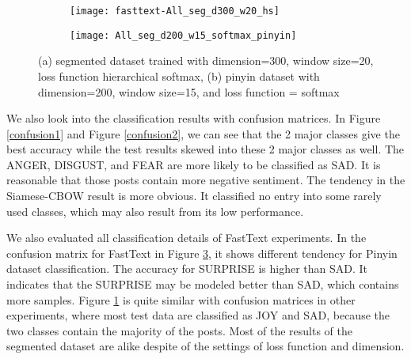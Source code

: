 \begin{figure}
\centering
\begin{subfigure}[b]{1\textwidth}
   \texttt{[image: fasttext-All\_seg\_d300\_w20\_hs]}
   \caption{}
   \label{confusion3} 
\end{subfigure}

\begin{subfigure}[b]{1\textwidth}
   \texttt{[image: All\_seg\_d200\_w15\_softmax\_pinyin]}
   \caption{}
   \label{confusion4}
\end{subfigure}
\caption[Confusion matrix of FastText]{(a) segmented dataset trained with dimension=300, window size=20, loss function hierarchical softmax,
(b) pinyin dataset with dimension=200, window size=15, and loss function = softmax
}
\end{figure}

We also look into the classification results with confusion matrices. 
In Figure \ref{confusion1} and Figure \ref{confusion2}, we can see that the 2 major classes give the best accuracy while the test results skewed into these 2 major classes as well.  
The ANGER, DISGUST, and FEAR are more likely to be classified as SAD. It is reasonable that those posts contain more negative sentiment.
The tendency in the Siamese-CBOW result is more obvious. It classified no entry into some rarely used classes, which may also result from its low performance.

We also evaluated all classification details of FastText experiments.
In the confusion matrix for FastText in Figure \ref{confusion4}, it shows different tendency for Pinyin dataset classification. 
The accuracy for SURPRISE is higher than SAD. It indicates that the SURPRISE may be modeled better than SAD, which contains more samples.
Figure \ref{confusion3} is quite similar with confusion matrices in other experiments, where most test data are classified as JOY and SAD, because the two classes contain the majority of the posts.
Most of the results of the segmented dataset are alike despite of the settings of loss function and dimension.
